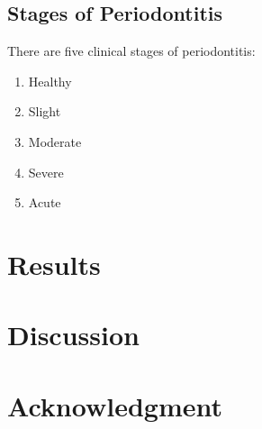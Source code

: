 \documentclass[aps, 11pt, a4paper]{article}
\begin{document}
    			
    	\subsection{Stages of Periodontitis}
    		There are five clinical stages of periodontitis:
    		\begin{enumerate}
				\item Healthy
				\item Slight
				\item Moderate
				\item Severe
				\item Acute
    		\end{enumerate}
    
    \section{Results}
    
    \section{Discussion}
    
    \section{Acknowledgment}
    
    
    
\end{document}

